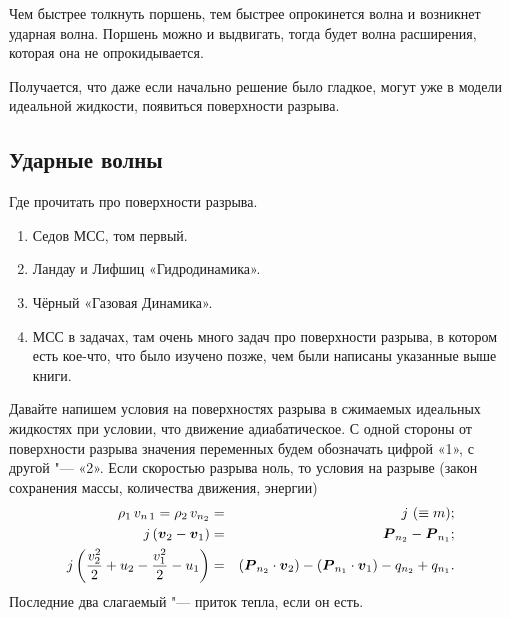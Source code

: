 Чем быстрее толкнуть поршень, тем быстрее опрокинется волна и возникнет ударная волна. Поршень можно и выдвигать, тогда будет волна расширения, которая она не опрокидывается.

Получается, что даже если начально решение было гладкое, могут уже в модели идеальной жидкости, появиться поверхности разрыва.

\subsection{Ударные волны}
Где прочитать про поверхности разрыва.
\begin{enumerate}
\item Седов МСС, том первый.
\item Ландау и Лифшиц «Гидродинамика».
\item Чёрный «Газовая Динамика».
\item МСС в задачах, там очень много задач про поверхности разрыва, в котором есть кое-что, что было изучено позже, чем были написаны указанные выше книги.
\end{enumerate}

Давайте напишем условия на поверхностях разрыва в сжимаемых идеальных жидкостях при условии, что движение адиабатическое. С одной стороны от поверхности разрыва значения переменных будем обозначать цифрой «1», с другой "--- «2». Если скоростью разрыва ноль, то условия на разрыве (закон сохранения массы, количества движения, энергии)
\begin{eqnarray*}
  \rho_1\,v_{n\,1} = \rho_2\,v_{n_2} &=&j\ (\equiv m);\\
  j\,(\boldsymbol{v}_2 - \boldsymbol{v}_1) &=& \boldsymbol{P}_{n_2}-\boldsymbol{P}_{n_1};\\ 
  j\left(\frac {v_2^2}2 + u_2 - \frac{v^2_1}2 - u_1\right) &=& (\boldsymbol{P}_{n_2}\cdot\boldsymbol{v}_2) - (\boldsymbol{P}_{n_1}\cdot\boldsymbol{v}_1) - q_{n_2} + q_{n_1}.
\end{eqnarray*}
Последние два слагаемый "--- приток тепла, если он есть.
